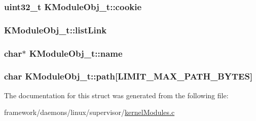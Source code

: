 \subsubsection[{\texorpdfstring{cookie}{cookie}}]{\setlength{\rightskip}{0pt plus 5cm}uint32\+\_\+t K\+Module\+Obj\+\_\+t\+::cookie}\hypertarget{struct_k_module_obj__t_a2a7109841c4adc4c314cda336f8f0f41}{}\label{struct_k_module_obj__t_a2a7109841c4adc4c314cda336f8f0f41}
\subsubsection[{\texorpdfstring{list\+Link}{listLink}}]{ K\+Module\+Obj\+\_\+t\+::list\+Link}\hypertarget{struct_k_module_obj__t_aacdf65672ea6e9b159c4f5fef124d05a}{}\label{struct_k_module_obj__t_aacdf65672ea6e9b159c4f5fef124d05a}
\subsubsection[{\texorpdfstring{name}{name}}]{\setlength{\rightskip}{0pt plus 5cm}char$\ast$ K\+Module\+Obj\+\_\+t\+::name}\hypertarget{struct_k_module_obj__t_a44c69d8387422def8b01c0783efbdfef}{}\label{struct_k_module_obj__t_a44c69d8387422def8b01c0783efbdfef}
\subsubsection[{\texorpdfstring{path}{path}}]{\setlength{\rightskip}{0pt plus 5cm}char K\+Module\+Obj\+\_\+t\+::path\mbox{[}{\bf L\+I\+M\+I\+T\+\_\+\+M\+A\+X\+\_\+\+P\+A\+T\+H\+\_\+\+B\+Y\+T\+ES}\mbox{]}}\hypertarget{struct_k_module_obj__t_a6c6bc990ad9809c6ce6c85fe8db8df5e}{}\label{struct_k_module_obj__t_a6c6bc990ad9809c6ce6c85fe8db8df5e}


The documentation for this struct was generated from the following file\+:\begin{DoxyCompactItemize}
\item 
framework/daemons/linux/supervisor/\hyperlink{kernel_modules_8c}{kernel\+Modules.\+c}\end{DoxyCompactItemize}

